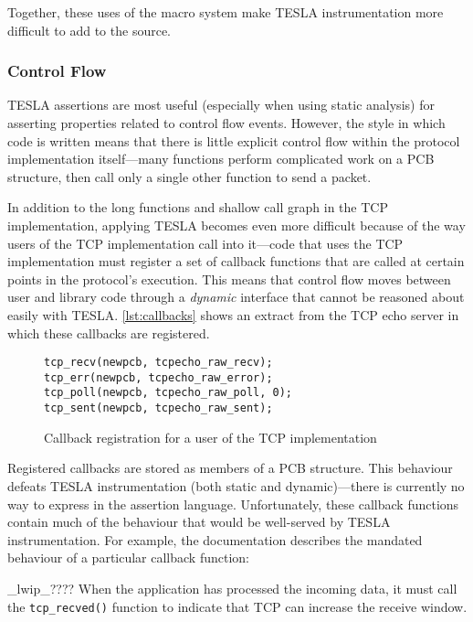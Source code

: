 Together, these uses of the macro system make TESLA instrumentation more difficult to add
to the \lwip{} source.

\subsubsection{Control Flow}

TESLA assertions are most useful (especially when using static analysis)
for asserting properties related to control flow events. However, the
style in which \lwip{} code is written means that there is little explicit
control flow within the protocol implementation itself---many functions
perform complicated work on a PCB structure, then call only a single
other function to send a packet.

In addition to the long functions and shallow call graph in the TCP
implementation, applying TESLA becomes even more difficult because of the way
users of the TCP implementation call into it---code that uses the TCP
implementation must register a set of callback functions that are called at
certain points in the protocol's execution. This means that control flow moves
between user and library code through a \emph{dynamic} interface that cannot be
reasoned about easily with TESLA. \autoref{lst:callbacks} shows an extract from the TCP
echo server in which these callbacks are registered.

\begin{figure}
  \begin{verbatim}
tcp_recv(newpcb, tcpecho_raw_recv);
tcp_err(newpcb, tcpecho_raw_error);
tcp_poll(newpcb, tcpecho_raw_poll, 0);
tcp_sent(newpcb, tcpecho_raw_sent);
  \end{verbatim}
  \caption{Callback registration for a user of the \lwip{} TCP implementation}
  \label{lst:callbacks}
\end{figure}

Registered callbacks are stored as members of a PCB structure. This
behaviour defeats TESLA instrumentation (both static and
dynamic)---there is currently no way to express  in the assertion language.
Unfortunately, these callback functions contain much of the behaviour
that would be well-served by TESLA instrumentation. For example, the
\lwip{} documentation describes the mandated behaviour of a particular
callback function:

\begin{displaycquote}{_lwip_????}
When the application has processed the incoming data, it must call the
\texttt{tcp_recved()} function to indicate that TCP can increase
the receive window.
\end{displaycquote}


